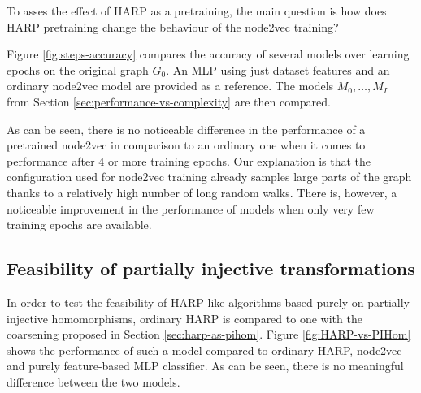 To asses the effect of HARP as a pretraining, the main question is how does HARP pretraining change the behaviour of the node2vec training?

Figure \ref{fig:steps-accuracy} compares the accuracy of several models over learning epochs on the original graph \( G_0 \). An MLP using just dataset features and an ordinary node2vec model are provided as a reference. The models \( M_0, \dots, M_L \) from Section \ref{sec:performance-vs-complexity} are then compared.

As can be seen, there is no noticeable difference in the performance of a pretrained node2vec in comparison to an ordinary one when it comes to performance after 4 or more training epochs. Our explanation is that the configuration used for node2vec training already samples large parts of the graph thanks to a relatively high number of long random walks. There is, however, a noticeable improvement in the performance of models when only very few training epochs are available.

\subsection{Feasibility of partially injective transformations}\label{sec:harp-vs-pihom}

In order to test the feasibility of HARP-like algorithms based purely on partially injective homomorphisms, ordinary HARP is compared to one with the coarsening proposed in Section \ref{sec:harp-as-pihom}. Figure \ref{fig:HARP-vs-PIHom} shows the performance of such a model compared to ordinary HARP, node2vec and purely feature-based MLP classifier. As can be seen, there is no meaningful difference between the two models.
